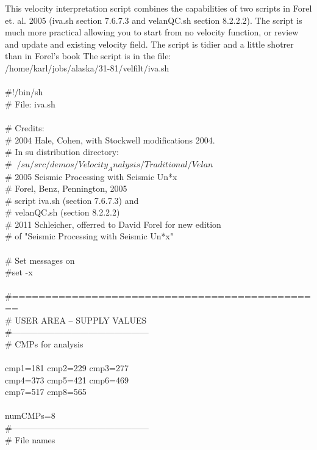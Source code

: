 ﻿This velocity interpretation script combines the capabilities of two scripts in Forel et. al. 2005 (iva.sh  section 7.6.7.3 and velanQC.sh section 8.2.2.2).  The script is much more practical allowing you to start from no velocity function, or review and update and existing velocity field.  The script is tidier and a little shotrer than in Forel's book The script is in the file: \\
 /home/karl/jobs/alaska/31-81/velfilt/iva.sh   \\
 \\
\#!/bin/sh \\
\# File: iva.sh \\
 \\
\# Credits: \\
\# 2004 Hale, Cohen, with Stockwell modifications 2004. \\
\#      In su distribution directory: \\
\#      $~/su/src/demos/Velocity_Analysis/Traditional/Velan$ \\
\# 2005 Seismic Processing with Seismic Un*x  \\
\#      Forel, Benz, Pennington, 2005 \\
\#      script iva.sh  (section 7.6.7.3) and  \\
\#      velanQC.sh (section 8.2.2.2) \\
\# 2011 Schleicher, offerred to David Forel for new edition \\
\#      of "Seismic Processing with Seismic Un*x" \\
 \\
\# Set messages on \\
\#set -x \\
 \\
\#=============================================== \\
\# USER AREA -- SUPPLY VALUES \\
\#------------------------------------------------ \\
\# CMPs for analysis \\
 \\
cmp1=181 cmp2=229 cmp3=277  \\
cmp4=373 cmp5=421 cmp6=469  \\
cmp7=517 cmp8=565 \\
 \\
numCMPs=8 \\
\#------------------------------------------------ \\
\# File names \\
